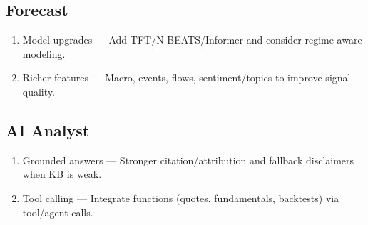 \subsection{Forecast}

\begin{enumerate}
    \item Model upgrades — Add TFT/N-BEATS/Informer and consider regime-aware modeling.
    \item Richer features — Macro, events, flows, sentiment/topics to improve signal quality.
\end{enumerate}

\subsection{AI Analyst}

\begin{enumerate}
    \item Grounded answers — Stronger citation/attribution and fallback disclaimers when KB is weak.
    \item Tool calling — Integrate functions (quotes, fundamentals, backtests) via tool/agent calls.
\end{enumerate}